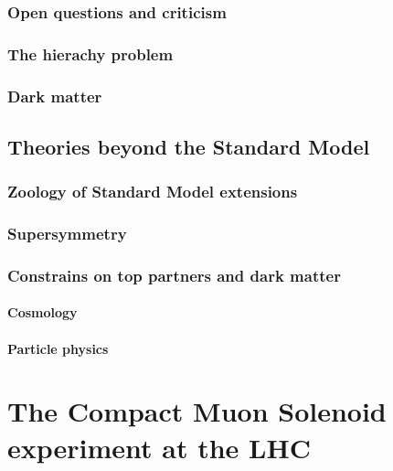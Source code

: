         \subsection{Open questions and criticism}
        \loremipsum
        \subsection{The hierachy problem}
        \loremipsum
        \subsection{Dark matter}
        \loremipsum

    \section{Theories beyond the Standard Model}
        \subsection{Zoology of Standard Model extensions}
        \loremipsum
        \subsection{Supersymmetry}
        \loremipsum
        \subsection{Constrains on top partners and dark matter}
        \loremipsum
            \subsubsection{Cosmology}
        \loremipsum
            \subsubsection{Particle physics}
        \loremipsum






\chapter{The Compact Muon Solenoid experiment at the LHC}

